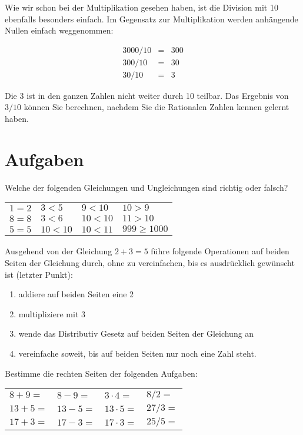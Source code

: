 Wie wir schon bei der Multiplikation gesehen haben, ist die Division mit 10 ebenfalls besonders einfach. Im Gegensatz zur Multiplikation werden anhängende Nullen einfach weggenommen:

\begin{eqnarray*}
3000 / 10 &=& 300 \\
300 / 10 &=& 30 \\
30 / 10 &=& 3
\end{eqnarray*}

Die 3 ist in den ganzen Zahlen nicht weiter durch 10 teilbar. Das Ergebnis von $3/10$ können Sie berechnen, nachdem Sie die Rationalen Zahlen kennen gelernt haben. 

\section{Aufgaben}

\begin{prob}
\label{arith.1.1}

Welche der folgenden Gleichungen und Ungleichungen sind richtig oder falsch?
\begin{center}
\begin{tabular}{C{2cm}C{2cm}C{2cm}C{2cm}}
$1=2$ & $3<5$ & $9<10$ & $10>9$ \\
$8=8$ & $3<6$ & $10<10$ & $11>10$ \\
$5=5$ & $10<10$ & $10<11$ & $999 \ge 1000$ 
\end{tabular}
\end{center}
\end{prob}

\begin{prob}
\label{arith.1.2}
Ausgehend von der Gleichung $2+3=5$ führe folgende Operationen auf beiden Seiten der Gleichung durch, ohne zu vereinfachen, bis es ausdrücklich gewünscht ist (letzter Punkt):
\begin{enumerate}
\item addiere auf beiden Seiten eine 2
\item multipliziere mit 3
\item wende das Distributiv Gesetz auf beiden Seiten der Gleichung an
\item vereinfache soweit, bis auf beiden Seiten nur noch eine Zahl steht.
\end{enumerate}
\end{prob}

\begin{prob}
\label{arith.1.3}

Bestimme die rechten Seiten der folgenden Aufgaben:
\begin{center}
\begin{tabular}{C{2cm}C{2cm}C{2cm}C{2cm}}
$8+9=$ & $8-9=$ & $3\cdot 4=$ & ${8/ 2}=$ \\
$13+5=$ & $13-5=$ & $13\cdot 5=$ & ${27/ 3}=$ \\
$17+3=$ & $17-3=$ & $17 \cdot 3=$ & ${25/ 5}=$ 
\end{tabular}
\end{center}
\end{prob}

